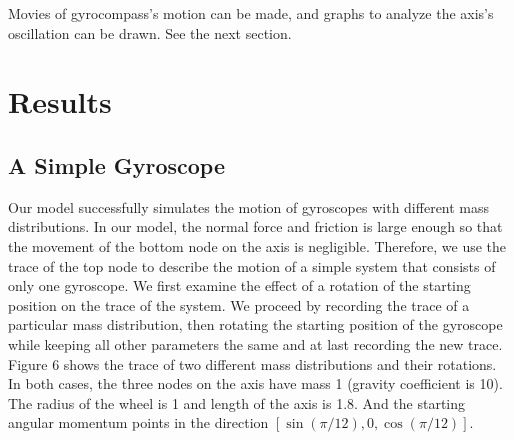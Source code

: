 \documentclass[12pt]{article}
\renewcommand{\(}{\left (}
\renewcommand{\)}{\right )}
\begin{document}
Movies of gyrocompass's motion can be made, and graphs to analyze the axis's oscillation can be drawn. See the next section.



\section{Results}
\subsection{A Simple Gyroscope}
\hspace{5mm} Our model successfully simulates the motion of gyroscopes with different mass distributions. In our model, the normal force and friction is large enough so that the movement of the bottom node on the axis is negligible. Therefore, we use the trace of the top node to describe the motion of a simple system that consists of only one gyroscope. We first examine the effect of a rotation of the starting position on the trace of the system. We proceed by recording the trace of a particular mass distribution, then rotating the starting position of the gyroscope while keeping all other parameters the same and at last recording the new trace. Figure 6 shows the trace of two different mass distributions and their rotations. In both cases, the three nodes on the axis have mass 1 (gravity coefficient is 10). The radius of the wheel is 1 and length of the axis is 1.8. And the starting angular momentum points in the direction $[\sin(\pi/12), 0, \cos(\pi/12)]$.
\end{document}
